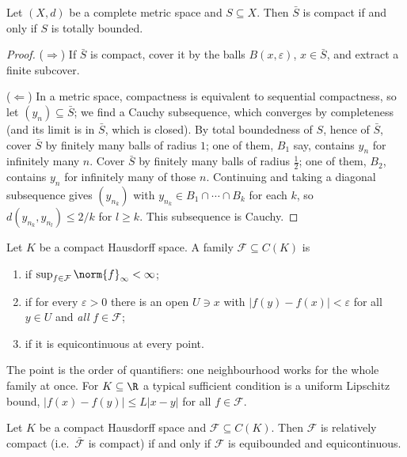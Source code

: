 \begin{proposition}
	Let $(X,d)$ be a complete metric space and $S \subseteq X$. Then $\bar S$ is compact if and only if $S$ is totally bounded.
\end{proposition}

\begin{proof}
	($\Rightarrow$) If $\bar S$ is compact, cover it by the balls $B(x,\varepsilon)$, $x \in \bar S$, and extract a finite subcover.

	($\Leftarrow$) In a metric space, compactness is equivalent to sequential compactness, so let $(y_n) \subseteq \bar S$; we find a Cauchy subsequence, which converges by completeness (and its limit is in $\bar S$, which is closed). By total boundedness of $S$, hence of $\bar S$, cover $\bar S$ by finitely many balls of radius $1$; one of them, $B_1$ say, contains $y_n$ for infinitely many $n$. Cover $\bar S$ by finitely many balls of radius $\frac12$; one of them, $B_2$, contains $y_n$ for infinitely many of those $n$. Continuing and taking a diagonal subsequence gives $(y_{n_k})$ with $y_{n_k} \in B_1 \cap \cdots \cap B_k$ for each $k$, so $d(y_{n_k}, y_{n_l}) \leq 2/k$ for $l \geq k$. This subsequence is Cauchy.
\end{proof}

\begin{definition}[Equicontinuity]
	Let $K$ be a compact Hausdorff space. A family $\mathcal{F} \subseteq C(K)$ is
	\begin{enumerate}[label=(\roman*)]
		\item {} if $\sup_{f \in \mathcal{F}} \norm{f}_\infty < \infty$;
		\item {} if for every $\varepsilon > 0$ there is an open $U \ni x$ with $|f(y) - f(x)| < \varepsilon$ for all $y \in U$ and \emph{all} $f \in \mathcal{F}$;
		\item {} if it is equicontinuous at every point.
	\end{enumerate}
\end{definition}

The point is the order of quantifiers: one neighbourhood works for the whole family at once. For $K \subseteq \R$ a typical sufficient condition is a uniform Lipschitz bound, $|f(x)-f(y)| \leq L|x-y|$ for all $f \in \mathcal{F}$.

\begin{theorem}
	Let $K$ be a compact Hausdorff space and $\mathcal{F} \subseteq C(K)$. Then $\mathcal{F}$ is relatively compact (i.e.\ $\bar{\mathcal{F}}$ is compact) if and only if $\mathcal{F}$ is equibounded and equicontinuous.
\end{theorem}

